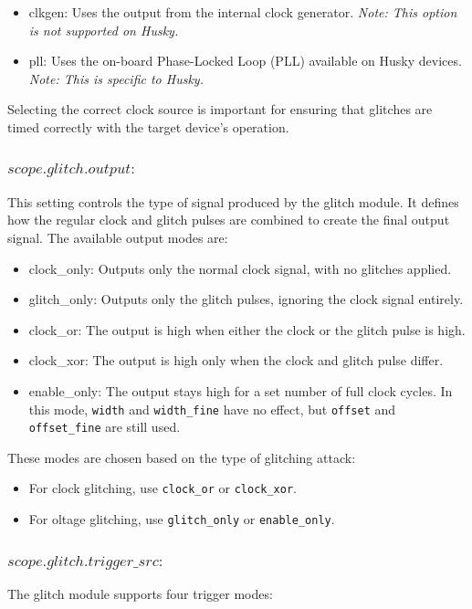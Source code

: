 \begin{itemize}
  \item clkgen: Uses the output from the internal clock generator. \textit{Note: This option is not supported on Husky.}
  \item pll: Uses the on-board Phase-Locked Loop (PLL) available on Husky devices. \textit{Note: This is specific to Husky.}
\end{itemize}

Selecting the correct clock source is important for ensuring that glitches are timed correctly with the target device’s operation.
\subsubsection{$scope.glitch.output :$}
This setting controls the type of signal produced by the glitch module. It defines how the regular clock and glitch pulses are combined to create the final output signal.
The available output modes are:

\begin{itemize}
  \item clock\_only: Outputs only the normal clock signal, with no glitches applied.
  \item glitch\_only: Outputs only the glitch pulses, ignoring the clock signal entirely.
  \item clock\_or: The output is high when either the clock or the glitch pulse is high.
  \item clock\_xor: The output is high only when the clock and glitch pulse differ.
  \item enable\_only: The output stays high for a set number of full clock cycles. In this mode, \texttt{width} and \texttt{width\_fine} have no effect, but \texttt{offset} and \texttt{offset\_fine} are still used.
\end{itemize}

These modes are chosen based on the type of glitching attack:
\begin{itemize}
    \item For clock glitching, use \texttt{clock\_or} or \texttt{clock\_xor}.
    \item For oltage glitching, use \texttt{glitch\_only} or \texttt{enable\_only}.
  \end{itemize}

\subsubsection{$scope.glitch.trigger\_src :$}    
The glitch module supports four trigger modes:


